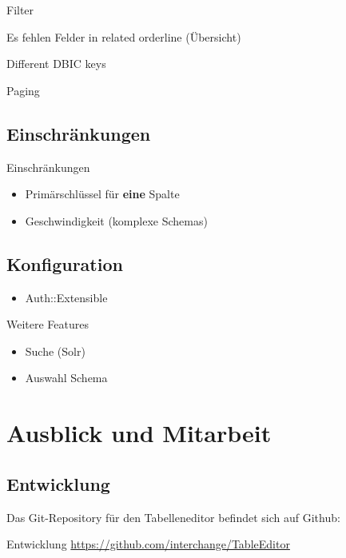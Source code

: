 Filter

Es fehlen Felder in related orderline (Übersicht)

Different DBIC keys

Paging

\subsection{Einschränkungen}
\begin{frame}{Einschränkungen}
\begin{itemize}
\item Primärschlüssel für \textbf{eine} Spalte
\item Geschwindigkeit (komplexe Schemas)
\end{itemize}
\end{frame}

\subsection{Konfiguration}
\begin{frame}
\begin{itemize}
\item Auth::Extensible
\end{itemize}
\end{frame}

\begin{frame}{Weitere Features}
\begin{itemize}
\item Suche (Solr)
\item Auswahl Schema
\end{itemize}
\end{frame}

\section{Ausblick und Mitarbeit}

\subsection{Entwicklung}

Das Git-Repository für den Tabelleneditor befindet sich auf Github:

\begin{frame}{Entwicklung}
\url{https://github.com/interchange/TableEditor}
\end{frame}

